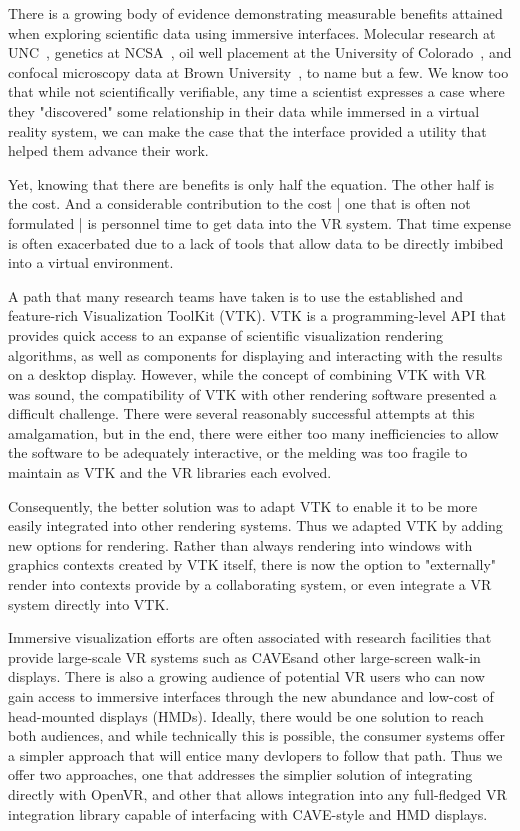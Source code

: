 
There is a growing body of evidence demonstrating measurable benefits
attained when exploring scientific data using immersive interfaces.
Molecular research at UNC~\cite{Brooks:1990},
genetics at NCSA~\cite{Brady:1995},
oil well placement at the University of Colorado~\cite{Gruchalla:2004},
and confocal microscopy data at Brown University~\cite{Prabhat:2008},
to name but a few.
We know too that while not scientifically verifiable, any time a scientist
expresses a case where they "discovered" some relationship in their data
while immersed in a virtual reality system, we can make the case that the
interface provided a utility that helped them advance their work.

Yet, knowing that there are benefits is only half the equation.
The other half is the cost.
And a considerable contribution to the cost | one that is often not
formulated | is personnel time to get data into the VR system.
That time expense is often exacerbated due to a lack of tools that
allow data to be directly imbibed into a virtual environment.

A path that many research teams have taken is to use the established and
feature-rich Visualization ToolKit (VTK).
VTK is a programming-level API that provides quick access to an expanse
of scientific visualization rendering algorithms, as well as components
for displaying and interacting with the results on a desktop display.
However, while the concept of combining VTK with VR was sound, the
compatibility of VTK with other rendering software presented a difficult
challenge.  
There were several reasonably successful attempts at this amalgamation,
but in the end, there were either too many inefficiencies to allow the
software to be adequately interactive, or the melding was too fragile to
maintain as VTK and the VR libraries each evolved.

Consequently, the better solution was to adapt VTK to enable it to be
more easily integrated into other rendering systems.
Thus we adapted VTK by adding new options for rendering.
Rather than always rendering into windows with graphics contexts
created by VTK itself, there is now the option to "externally" render
into contexts provide by a collaborating system, or even integrate a
VR system directly into VTK.


Immersive visualization efforts are often associated with research
facilities that provide large-scale VR systems such as CAVEs\texttrademark and
other large-screen walk-in displays.
There is also a growing audience of potential VR users who can now
gain access to immersive interfaces through the new abundance and low-cost
of head-mounted displays (HMDs).
Ideally, there would be one solution to reach both audiences, and while
technically this is possible, the consumer systems offer a simpler
approach that will entice many devlopers to follow that path.
Thus we offer two approaches, one that addresses the simplier solution
of integrating directly with OpenVR, and other that allows integration
into any full-fledged VR integration library capable of interfacing
with CAVE-style and HMD displays.


